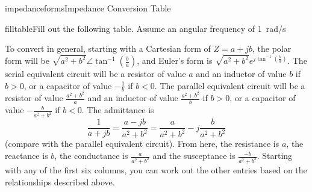 \begin{mainquestion}{impedanceforms}{Impedance Conversion Table}
\begin{partquestion}{filltable}{Fill out the following table. Assume an angular frequency of \qty{1}{\radian/\second}}
\begin{answer}
To convert in general, starting with a Cartesian form of $Z = a + jb$, the polar form will be $\sqrt{a^{2} + b^{2}}\angle\tan^{-1}\left(\frac{b}{a}\right)$, and Euler's form is $\sqrt{a^{2} + b^{2}}e^{j\tan^{-1}\left(\frac{b}{a}\right)}$. The serial equivalent circuit will be a resistor of value $a$ and an inductor of value $b$ if $b > 0$, or a capacitor of value $-\frac{1}{b}$ if $b < 0$. The parallel equivalent circuit will be a resistor of value $\frac{a^{2} + b^{2}}{a}$ and an inductor of value $\frac{a^{2} + b^{2}}{b}$ if $b > 0$, or a capacitor of value $-\frac{b}{a^{2} + b^{2}}$ if $b < 0$. The admittance is
\[
\frac{1}{a + jb} = \frac{a - jb}{a^{2} + b^{2}} = \frac{a}{a^{2} + b^{2}} - j\frac{b}{a^{2} + b^{2}}
\]
(compare with the parallel equivalent circuit). From here, the resistance is $a$, the reactance is $b$, the conductance is $\frac{a}{a^{2} + b^{2}}$ and the susceptance is $\frac{-b}{a^{2} + b^{2}}$.
Starting with any of the first six columns, you can work out the other entries based on the relationships described above.
\end{answer}
\end{partquestion}

\end{mainquestion}